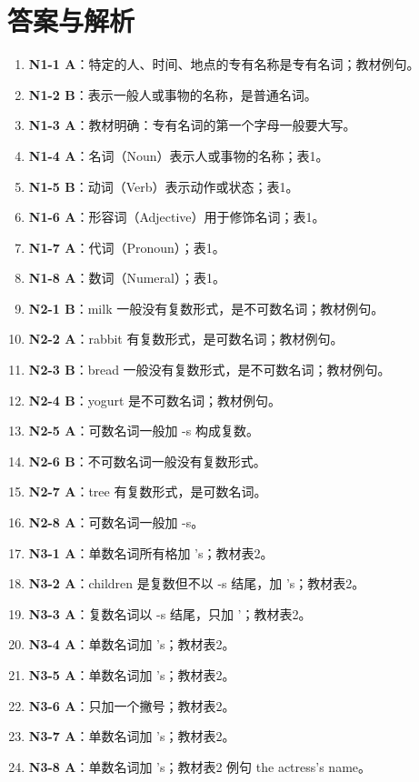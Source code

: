 \documentclass[11pt,a4paper]{ctexart}
\begin{document}
\section*{答案与解析}
\small
\begin{enumerate}[leftmargin=1.6em,itemsep=2pt]
\item \textbf{N1-1 A}：特定的人、时间、地点的专有名称是专有名词；教材例句。
\item \textbf{N1-2 B}：表示一般人或事物的名称，是普通名词。
\item \textbf{N1-3 A}：教材明确：专有名词的第一个字母一般要大写。
\item \textbf{N1-4 A}：名词（Noun）表示人或事物的名称；表1。
\item \textbf{N1-5 B}：动词（Verb）表示动作或状态；表1。
\item \textbf{N1-6 A}：形容词（Adjective）用于修饰名词；表1。
\item \textbf{N1-7 A}：代词（Pronoun）；表1。
\item \textbf{N1-8 A}：数词（Numeral）；表1。
\item \textbf{N2-1 B}：milk 一般没有复数形式，是不可数名词；教材例句。
\item \textbf{N2-2 A}：rabbit 有复数形式，是可数名词；教材例句。
\item \textbf{N2-3 B}：bread 一般没有复数形式，是不可数名词；教材例句。
\item \textbf{N2-4 B}：yogurt 是不可数名词；教材例句。
\item \textbf{N2-5 A}：可数名词一般加 -s 构成复数。
\item \textbf{N2-6 B}：不可数名词一般没有复数形式。
\item \textbf{N2-7 A}：tree 有复数形式，是可数名词。
\item \textbf{N2-8 A}：可数名词一般加 -s。
\item \textbf{N3-1 A}：单数名词所有格加 ’s；教材表2。
\item \textbf{N3-2 A}：children 是复数但不以 -s 结尾，加 ’s；教材表2。
\item \textbf{N3-3 A}：复数名词以 -s 结尾，只加 ’；教材表2。
\item \textbf{N3-4 A}：单数名词加 ’s；教材表2。
\item \textbf{N3-5 A}：单数名词加 ’s；教材表2。
\item \textbf{N3-6 A}：只加一个撇号；教材表2。
\item \textbf{N3-7 A}：单数名词加 ’s；教材表2。
\item \textbf{N3-8 A}：单数名词加 ’s；教材表2 例句 the actress’s name。

\end{enumerate}
\end{document}
